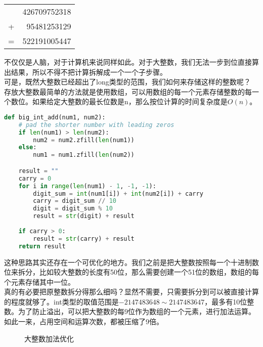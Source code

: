 \begin{table}[H]
	\centering
	\begin{tabular}{cD{.}{.}{3}}
		  & 426709752318 \\
		+ & 95481253129  \\
		\hline
		= & 522191005447
	\end{tabular}
\end{table}

不仅仅是人脑，对于计算机来说同样如此。对于大整数，我们无法一步到位直接算出结果，所以不得不把计算拆解成一个一个子步骤。\\

可是，既然大整数已经超出了long类型的范围，我们如何来存储这样的整数呢？\\

存放大整数最简单的方法就是使用数组，可以用数组的每一个元素存储整数的每一个数位。如果给定大整数的最长位数是n，那么按位计算的时间复杂度是$ O(n) $。\\


\begin{lstlisting}[language=Python]
def big_int_add(num1, num2):
    # pad the shorter number with leading zeros
    if len(num1) > len(num2):
        num2 = num2.zfill(len(num1))
    else:
        num1 = num1.zfill(len(num2))

    result = ""
    carry = 0
    for i in range(len(num1) - 1, -1, -1):
        digit_sum = int(num1[i]) + int(num2[i]) + carry
        carry = digit_sum // 10
        digit = digit_sum % 10
        result = str(digit) + result
    
    if carry > 0:
        result = str(carry) + result
    return result
\end{lstlisting}

这种思路其实还存在一个可优化的地方。我们之前是把大整数按照每一个十进制数位来拆分，比如较大整数的长度有50位，那么需要创建一个51位的数组，数组的每个元素存储其中一位。\\

真的有必要把原整数拆分得那么细吗？显然不需要，只需要拆分到可以被直接计算的程度就够了。int类型的取值范围是$ -2147483648 \sim 2147483647 $，最多有10位整数。为了防止溢出，可以把大整数的每9位作为数组的一个元素，进行加法运算。如此一来，占用空间和运算次数，都被压缩了9倍。

\begin{figure}[H]
	\centering
	\caption{大整数加法优化}
\end{figure}


